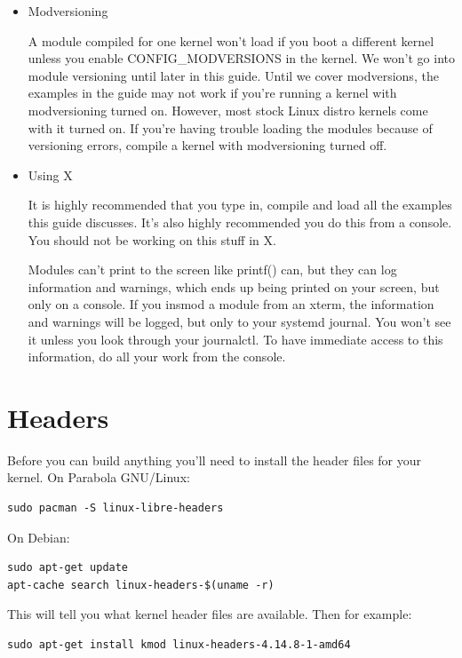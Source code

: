 \documentclass[11pt]{article}
\begin{document}
\begin{itemize}
\item Modversioning
\label{sec:orge3b3039}

A module compiled for one kernel won't load if you boot a different kernel unless you enable CONFIG\_MODVERSIONS in the kernel. We won't go into module versioning until later in this guide. Until we cover modversions, the examples in the guide may not work if you're running a kernel with modversioning turned on. However, most stock Linux distro kernels come with it turned on. If you're having trouble loading the modules because of versioning errors, compile a kernel with modversioning turned off.

\item Using X
\label{sec:orgedf122e}

It is highly recommended that you type in, compile and load all the examples this guide discusses. It's also highly recommended you do this from a console. You should not be working on this stuff in X.

Modules can't print to the screen like printf() can, but they can log information and warnings, which ends up being printed on your screen, but only on a console. If you insmod a module from an xterm, the information and warnings will be logged, but only to your systemd journal. You won't see it unless you look through your journalctl. To have immediate access to this information, do all your work from the console.
\end{itemize}

\section*{Headers}
\label{sec:orge6f432c}
Before you can build anything you'll need to install the header files for your kernel. On Parabola GNU/Linux:

\begin{verbatim}
sudo pacman -S linux-libre-headers
\end{verbatim}

On Debian:

\begin{verbatim}
sudo apt-get update
apt-cache search linux-headers-$(uname -r)
\end{verbatim}

This will tell you what kernel header files are available. Then for example:

\begin{verbatim}
sudo apt-get install kmod linux-headers-4.14.8-1-amd64
\end{verbatim}
\end{document}
